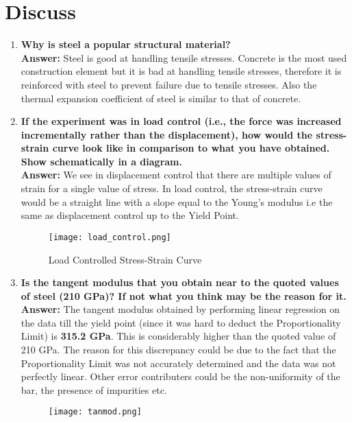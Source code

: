 \documentclass[12pt]{report}
\begin{document}
\section{Discuss}
\begin{enumerate}
    \item \textbf{Why is steel a popular structural material?\\}
          \textbf{Answer:} Steel is good at handling tensile stresses.
          Concrete is the most used construction element but it is bad at handling tensile stresses,
          therefore it is reinforced with steel to prevent failure due to tensile stresses.
          Also the thermal expansion coefficient of steel is similar to that of concrete.
    \item \textbf{If the experiment was in load control (i.e., the force was increased
              incrementally rather than the displacement), how would the stress-strain
              curve look like in comparison to what you have obtained. Show
              schematically in a diagram.}\\
          \textbf{Answer:} We see in displacement control that there are multiple values of strain for a single value of stress.
          In load control, the stress-strain curve would be a straight line with a slope equal to the Young's modulus i.e
          the same as displacement control up to the Yield Point.
          \begin{figure}[H]
              \centering
              \texttt{[image: load\_control.png]}
              \caption{Load Controlled Stress-Strain Curve}
          \end{figure}

    \item \textbf{Is the tangent modulus that you obtain near to the quoted values of steel
              (210 GPa)? If not what you think may be the reason for it.}\\
          \textbf{Answer:} The tangent modulus obtained by performing linear regression on the data till the yield point (since it was hard to deduct the Proportionality Limit) is \textbf{315.2 GPa}.
          This is considerably higher than the quoted value of 210 GPa. The reason for this discrepancy could be due to the fact that the Proportionality Limit was not accurately determined and the data was not perfectly linear.
          Other error contributers could be the non-uniformity of the bar, the presence of impurities etc.
          \begin{figure}[H]
              \centering
              \texttt{[image: tanmod.png]}
          \end{figure}


\end{enumerate}
\end{document}
